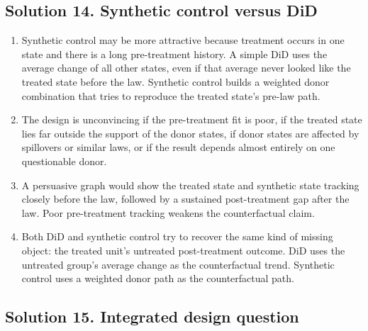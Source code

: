 \documentclass[11pt]{article}
\begin{document}
\subsection*{Solution 14. Synthetic control versus DiD}

\begin{solutionbox}
\begin{enumerate}[label=(\alph*)]
\item Synthetic control may be more attractive because treatment occurs in one state and there is a long pre-treatment history. A simple DiD uses the average change of all other states, even if that average never looked like the treated state before the law. Synthetic control builds a weighted donor combination that tries to reproduce the treated state's pre-law path.

\item The design is unconvincing if the pre-treatment fit is poor, if the treated state lies far outside the support of the donor states, if donor states are affected by spillovers or similar laws, or if the result depends almost entirely on one questionable donor.

\item A persuasive graph would show the treated state and synthetic state tracking closely before the law, followed by a sustained post-treatment gap after the law. Poor pre-treatment tracking weakens the counterfactual claim.

\item Both DiD and synthetic control try to recover the same kind of missing object: the treated unit's untreated post-treatment outcome. DiD uses the untreated group's average change as the counterfactual trend. Synthetic control uses a weighted donor path as the counterfactual path.
\end{enumerate}
\end{solutionbox}

\subsection*{Solution 15. Integrated design question}
\end{document}
